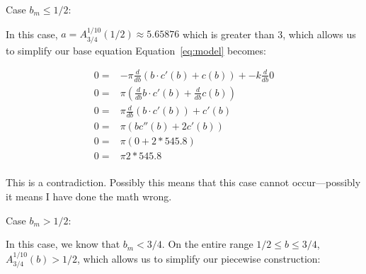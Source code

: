 \documentclass[]{asme2ej}
\begin{document}
Case $b_m \leq 1/2$:

In this case, $a = A_{3/4}^{1/10}(1/2) \approx 5.65876$ which is greater than 3, which
allows us to simplify our base equation
Equation~\ref{eq:model} becomes:

\begin{align}
  0 = & - \pi \frac{d}{db} ( b \cdot c'(b) + c(b)) +
  - k \frac{d}{db} 0 \\
  0 = & \pi (\frac{d}{db} b \cdot c'(b) + \frac{d}{db} c(b)) \\
  0 = & \pi \frac{d}{db} (b \cdot c'(b)) +  c'(b) \\
  0 = & \pi (b c''(b) + 2c'(b)) \\
  0 = & \pi (0 + 2 * 545.8) \\
  0 = & \pi 2 * 545.8 \\
  \end{align}

This is a contradiction. Possibly this means that this case cannot occur---possibly it means I have done the math wrong.

Case $b_m > 1/2$:

In this case, we know that $b_m < 3/4$. On the entire range $ 1/2 \leq b \leq 3/4 $, $ A_{3/4}^{1/10}(b) > 1/2$,
which allows us to simplify our piecewise construction:
\end{document}
